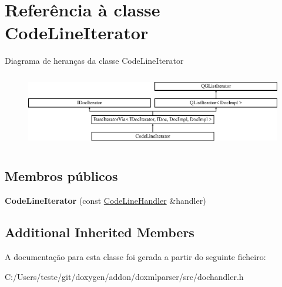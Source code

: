 \hypertarget{class_code_line_iterator}{\section{Referência à classe Code\-Line\-Iterator}
\label{class_code_line_iterator}
}
Diagrama de heranças da classe Code\-Line\-Iterator\begin{figure}[H]
\begin{center}
\leavevmode
\includegraphics[height=3.294118cm]{class_code_line_iterator}
\end{center}
\end{figure}
\subsection*{Membros públicos}
\begin{DoxyCompactItemize}
\item 
\hypertarget{class_code_line_iterator_a49590b5d6e06afd21661f176f08ee32a}{{\bfseries Code\-Line\-Iterator} (const \hyperlink{class_code_line_handler}{Code\-Line\-Handler} \&handler)}\label{class_code_line_iterator_a49590b5d6e06afd21661f176f08ee32a}

\end{DoxyCompactItemize}
\subsection*{Additional Inherited Members}


A documentação para esta classe foi gerada a partir do seguinte ficheiro\-:\begin{DoxyCompactItemize}
\item 
C\-:/\-Users/teste/git/doxygen/addon/doxmlparser/src/dochandler.\-h\end{DoxyCompactItemize}
